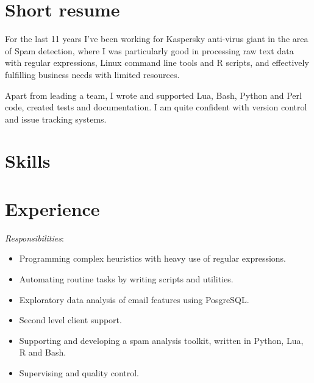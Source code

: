 \documentclass[11pt,a4paper,sans]{moderncv}        %
\newcommand{\responsibilities}[1]{ \emph{Responsibilities}:\begin{itemize} #1\end{itemize}}
\begin{document}
\makecvtitle

\section{Short resume}

For the last 11 years I've been working for Kaspersky anti-virus giant in the area of Spam detection, where I was particularly good in processing raw text data with regular expressions, Linux command line tools and R scripts, and effectively fulfilling business needs with limited resources.
\par\medskip
Apart from leading a team, I wrote and supported Lua, Bash, Python and Perl code, created tests and documentation. I am quite confident with version control and issue tracking systems. 



\section{Skills}



\section{Experience}

 {
    \responsibilities {
        \item Programming complex heuristics with heavy use of regular expressions.
        \item Automating routine tasks by writing scripts and utilities.
        \item Exploratory data analysis of email features using PosgreSQL.
        \item Second level client support.
	\item Supporting and developing a spam analysis toolkit, written in Python, Lua, R and Bash.
        \item Supervising and quality control.
    }
}
\end{document}
